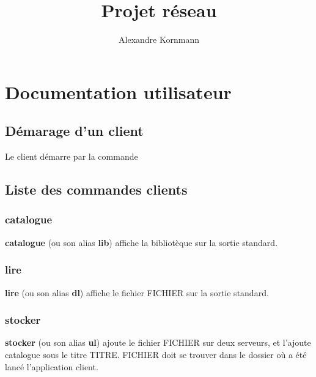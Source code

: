 \documentclass[10pt,a4paper]{article}
\title{Projet réseau}
\author{Alexandre Kornmann}
\begin{document}
\maketitle

\newpage

\tableofcontents

\newpage

\section{Documentation utilisateur}
\subsection{Démarage d'un client}

Le client démarre par la commande
\begin{center}
\end{center}

\subsection{Liste des commandes clients}

\subsubsection{catalogue}
\begin{center}
\end{center}
\textbf{catalogue} (ou son alias \textbf{lib}) affiche la bibliotèque sur la sortie standard.

\subsubsection{lire}
\begin{center}
\end{center}
\textbf{lire} (ou son alias \textbf{dl}) affiche le fichier FICHIER sur la sortie standard.

\subsubsection{stocker}
\begin{center}
\end{center}
\textbf{stocker} (ou son alias \textbf{ul}) ajoute le fichier FICHIER sur deux serveurs, et l'ajoute catalogue sous le titre TITRE. FICHIER doit se trouver dans le dossier où a été lancé l'application client.
\end{document}
